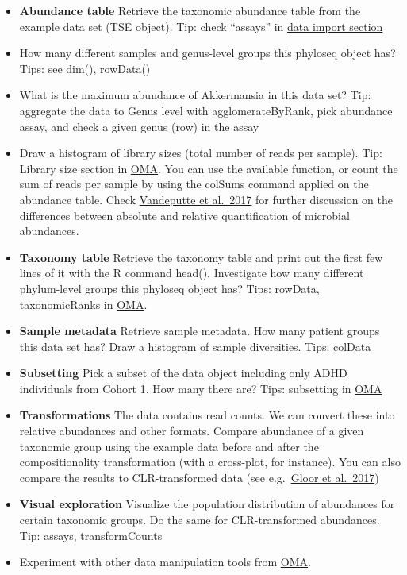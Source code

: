 \documentclass[
  oneside]{book}
\begin{document}
\begin{itemize}
\item
  \textbf{Abundance table} Retrieve the taxonomic abundance table from the
  example data set (TSE object). Tip: check ``assays'' in \href{https://microbiome.github.io/OMA/data-introduction.html\#loading-experimental-microbiome-data}{data import
  section}
\item
  How many different samples and genus-level groups this phyloseq
  object has? Tips: see dim(), rowData()
\item
  What is the maximum abundance of Akkermansia in this data set? Tip:
  aggregate the data to Genus level with agglomerateByRank, pick
  abundance assay, and check a given genus (row) in the assay
\item
  Draw a histogram of library sizes (total number of reads per
  sample). Tip: Library size section in
  \href{https://microbiome.github.io/OMA/quality-control.html}{OMA}. You
  can use the available function, or count the sum of reads per
  sample by using the colSums command applied on the abundance
  table. Check \href{https://www.nature.com/articles/nature24460}{Vandeputte et
  al.~2017} for further
  discussion on the differences between absolute and relative
  quantification of microbial abundances.
\item
  \textbf{Taxonomy table} Retrieve the taxonomy table and print out the
  first few lines of it with the R command head(). Investigate how
  many different phylum-level groups this phyloseq object has? Tips:
  rowData, taxonomicRanks in
  \href{https://microbiome.github.io/OMA/taxonomic-information.html\#functions-to-access-taxonomic-information}{OMA}.
\item
  \textbf{Sample metadata} Retrieve sample metadata. How many patient
  groups this data set has? Draw a histogram of sample
  diversities. Tips: colData
\item
  \textbf{Subsetting} Pick a subset of the data object including only
  ADHD individuals from Cohort 1. How many there are? Tips: subsetting in \href{https://microbiome.github.io/OMA/datamanipulation.html\#subsetting}{OMA}
\item
  \textbf{Transformations} The data contains read counts. We can convert
  these into relative abundances and other formats. Compare abundance
  of a given taxonomic group using the example data before and after
  the compositionality transformation (with a cross-plot, for
  instance). You can also compare the results to CLR-transformed data
  (see e.g.~\href{https://www.frontiersin.org/articles/10.3389/fmicb.2017.02224/full}{Gloor et
  al.~2017})
\item
  \textbf{Visual exploration} Visualize the population distribution of
  abundances for certain taxonomic groups. Do the same for
  CLR-transformed abundances. Tip: assays, transformCounts
\item
  Experiment with other data manipulation tools from
  \href{https://microbiome.github.io/OMA/taxonomic-information.html\#functions-to-access-taxonomic-information}{OMA}.
\end{itemize}
\end{document}
